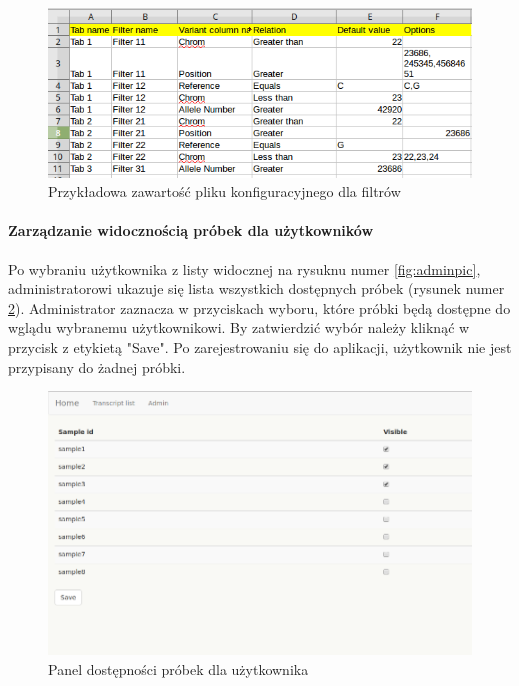 \documentclass[a4paper,12pt,twoside]{article}
\begin{document}
\begin{figure}[h!]
  \centering
  \includegraphics[width=\textwidth]{obrazy/aplikacja/input_file.png}
  \caption{Przykładowa zawartość pliku konfiguracyjnego dla filtrów}
  \label{fig:input_filepic}
\end{figure}

\newpage
\paragraph{Zarządzanie widocznością próbek dla użytkowników}
Po wybraniu użytkownika z listy widocznej na rysuknu numer \ref{fig:adminpic}, 
administratorowi ukazuje się lista wszystkich dostępnych próbek (rysunek numer \ref{fig:user_priviligespic}). Administrator zaznacza w przyciskach wyboru, które próbki będą dostępne 
do wglądu wybranemu użytkownikowi. By zatwierdzić wybór należy kliknąć w 
przycisk z etykietą "Save".
Po zarejestrowaniu się do aplikacji, użytkownik nie jest przypisany do żadnej próbki. 
 
\begin{figure}[h]
  \centering
  \includegraphics[width=\textwidth]{obrazy/aplikacja/user_priviliges.png}
  \caption{Panel dostępności próbek dla użytkownika}
  \label{fig:user_priviligespic}
\end{figure}
\end{document}
